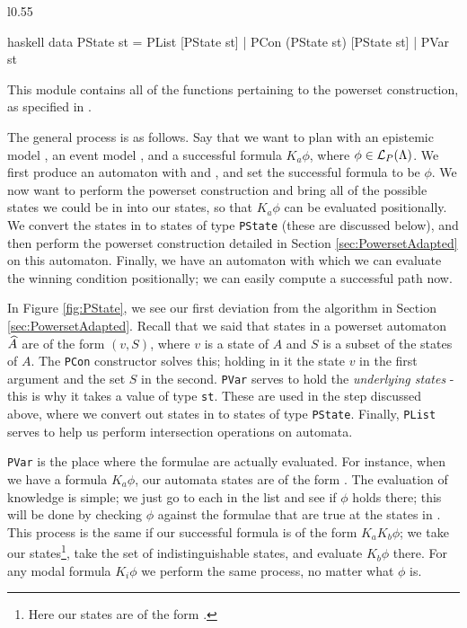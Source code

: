 \documentclass[10pt, a4paper]{report}
\begin{document}
\begin{wrapfigure}{l}{0.55\textwidth}
  \centering
    \begin{cminted}{haskell}
      data PState st = PList [PState st] 
                     | PCon (PState st) 
                            [PState st] 
                     | PVar st 
    \end{cminted}
  \caption{The  datatype.}
  \label{fig:PState}
\end{wrapfigure}

This module contains all of the functions pertaining to the powerset
construction, as specified in .

The general process is as follows. Say that we want to plan with an epistemic
model , an event model , and a successful formula $K_a \phi$,
where $\phi \in \mathcal{L}_P(\Lambda)$. We first produce an \mestar automaton
with  and , and set the successful formula to be $\phi$. We now
want to perform the powerset construction and bring all of the possible states
we could be in into our states, so that $K_a \phi$ can be evaluated
positionally. We convert the states in \mestar to states of type
\texttt{PState} (these are discussed below), and then perform the
powerset construction detailed in Section \ref{sec:PowersetAdapted} on this
automaton. Finally, we have an automaton with which we can evaluate the winning
condition positionally; we can easily compute a successful path now. 

In Figure \ref{fig:PState}, we see our first deviation from the algorithm in
Section \ref{sec:PowersetAdapted}. Recall that we said that states in a powerset
automaton $\widehat{A}$ are of the form $(v, S)$, where $v$ is a state of $A$ and $S$
is a subset of the states of $A$. The \texttt{PCon} constructor
solves this; holding in it the state $v$ in the first argument and the set $S$
in the second. \texttt{PVar} serves to hold the \emph{underlying
  states} - this is why it takes a value of type \texttt{st}. These
are used in the step discussed above, where we convert out states in \mestar to
states of type \texttt{PState}. Finally,
\texttt{PList} serves to help us perform intersection
operations on automata.

\texttt{PVar} is the place where the formulae are actually
evaluated. For instance, when we have a formula $K_a \phi$, our automata states
are of the form . The evaluation of knowledge is
simple; we just go to each  in the list and see if $\phi$ holds there;
this will be done by checking $\phi$ against the formulae that are true at the
states in . This process is the same if our successful formula is of
the form $K_a K_b \phi$; we take our states\footnote{Here our states are of the
  form .}, take
the set of indistinguishable states, and evaluate $K_b \phi$ there. For any
modal formula $K_i \phi$ we perform the same process, no matter what $\phi$ is.
\end{document}
